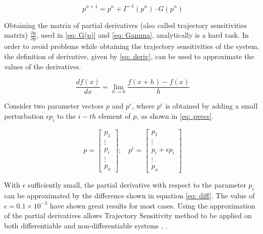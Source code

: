 \begin{equation}
	p^{n+1} = p^{n} + \Gamma^{-1}(p^{n})\cdot G(p^{n})
\end{equation}

Obtaining the matrix of partial derivatives (also called trajectory sensitivities matrix) $\frac{\partial y}{\partial p}$, used in \eqref{eq: G(p)} and \eqref{eq: Gamma}, analytically is a hard task. In order to avoid problems while obtaining the trajectory sensitivities of the system, the definition of derivative, given by \eqref{eq: deriv}, can be used to approximate the values of the derivatives.

\begin{equation}
	\frac{df(x)}{dx} = \lim\limits_{h \to 0} \frac{f(x + h) - f(x)}{h}
	\label{eq: deriv}
\end{equation}

Consider two parameter vectors $p$ and $p^{\epsilon}$, where $p^{\epsilon}$ is obtained by adding a small perturbation $\epsilon p_{i}$ to the $i-th$ element of $p$, as shown in \eqref{eq: pvecs}.

\begin{equation}
	p = 
	\begin{bmatrix}
		p_{1} \\
		\vdots \\
		p_{i} \\
		\vdots \\
		p_{n}
	\end{bmatrix}; \ \ \ \ 
	 p^{\epsilon} =
	\begin{bmatrix}
		p_{1} \\
		\vdots \\
		p_{i} + \epsilon p_{i} \\
		\vdots \\
		p_{n}
	\end{bmatrix}
	\label{eq: pvecs}
\end{equation}

With $\epsilon$ sufficiently small, the partial derivative with respect to the parameter $p_{i}$ can be approximated by the difference shown in equation \eqref{eq: diff}. The value of $\epsilon = 0.1 \times 10^{-3}$ have shown great results for most cases. Using the approximation of the partial derivatives allows Trajectory Sensitivity method to be applied on both differentiable and non-differentiable systems \cite{Benchluch1993}, \cite{Cari2006}.
 

